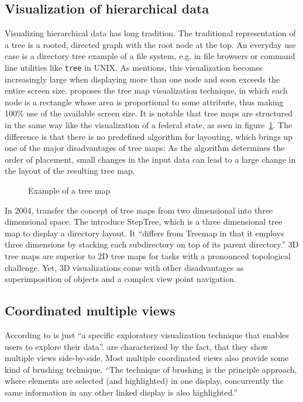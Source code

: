 \documentclass{article}
\begin{document}
\subsection{Visualization of hierarchical data}
Visualizing hierarchical data has long tradition.
The traditional representation of a tree is a rooted, directed graph with the root node at the top.
An everyday use case is a directory tree example of a file system, e.g. in file browsers or command line utilities like \texttt{tree} in UNIX.
As \textcite{Shneiderman1992} mentions, this visualization becomes increasingly large when displaying more than one node and soon exceeds the entire screen size.
\textcite{Johnson1991} proposes the tree map visualization technique, in which each node is a rectangle whose area is proportional to some attribute, thus making 100\% use of the available screen size.
It is notable that tree maps are structured in the same way like the visualization of a federal state, as seen in figure~\ref{fig:research:treemap}.
The difference is that there is no predefined algorithm for layouting, which brings up one of the major disadvantages of tree maps:
As the algorithm determines the order of placement, small changes in the input data can lead to a large change in the layout of the resulting tree map.

\begin{figure}[h]
\centering
\caption{Example of a tree map}
\label{fig:research:treemap}
\end{figure}

In 2004, \textcite{Bladh2004} transfer the concept of tree maps from two dimensional into three dimensional space.
The introduce StepTree, which is a three dimensional tree map to display a directory layout.
It ``differs from Treemap in that it employs three dimensions by stacking each subdirectory on top of its parent directory.''\cite{Bladh2004}
3D tree maps are superior to 2D tree maps for tasks with a pronounced topological challenge.
Yet, 3D visualizations come with other disadvantages as superimposition of objects and a complex view point navigation.


\subsection{Coordinated multiple views}
According to \textcite{cmv:state_of_the_art} \cmvs{} is just ``a specific exploratory visualization technique that enables users to explore their data''.
\cmvs{} are characterized by the fact, that they show multiple views side-by-side.
Most multiple coordinated views also provide some kind of brushing technique.
``The technique of brushing is the principle approach, where elements are selected (and highlighted) in one display, concurrently the same information in any other linked display is also highlighted.''\cite{cmv:state_of_the_art}
\end{document}
